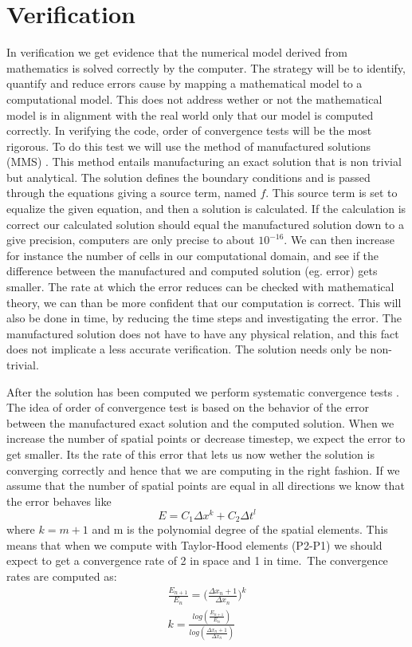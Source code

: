 \section{Verification}
In verification we get evidence that the numerical model derived from mathematics is solved correctly by the computer. The strategy will be to identify, quantify and reduce errors cause by mapping a mathematical model to a computational model. This does not address wether or not the mathematical model is in alignment with the real world only that our model is computed correctly.
In verifying the code, order of convergence tests will be the most rigorous. To do this test we will use the method of manufactured solutions (MMS) \cite{Roache2002}. This method entails manufacturing an exact solution that is non trivial but analytical. The solution defines the boundary conditions and is passed through the equations giving a source term, named $f$. This source term is set to equalize the given equation, and then a solution is calculated. If the calculation is correct our calculated solution should equal the manufactured solution down to a give precision, computers are only precise to about $10^{-16}$. We can then increase for instance the number of cells in our computational domain, and see if the difference between the manufactured and computed solution (eg. error) gets smaller. The rate at which the error reduces can be checked with mathematical theory, we can than be more confident that our computation is correct. This will also be done in time, by reducing the time steps and investigating the error. The manufactured solution does not have to have any physical relation, and this fact does not implicate a less accurate verification. The solution needs only be non-trivial.

After the solution has been computed we perform systematic convergence tests \cite{Roache}. The idea of order of convergence test is based on the behavior of the error between the manufactured exact solution and the computed solution. When we increase the number of spatial points or decrease timestep, we expect the error to get smaller. Its the rate of this error that lets us now wether the solution is converging correctly and hence that we are computing in the right fashion.
If we assume that the number of spatial points are equal in all directions we know that the error behaves like
$$ E = C_1 \Delta x^k+ C_2 \Delta t^l $$
where $ k = m+1 $ and m is the polynomial degree of the spatial elements. This means that when we compute with Taylor-Hood elements (P2-P1) we should expect to get a convergence rate of 2 in space and 1 in time.\
The convergence rates are computed as:
\begin{align}
\frac{E_{n+1}}{E_n} = \big( \frac{\Delta x_n+1}{\Delta x_n} \big)^k \\
k = \frac{log( \frac{E_{n+1}}{E_n}) }{ log(\frac{\Delta x_n+1}{\Delta x_n})}
\end{align}

